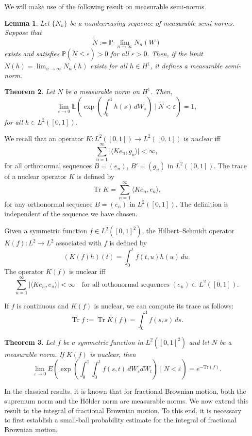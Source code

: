 \documentclass[preprint,12pt]{elsarticle}
\newtheorem{theorem}{Theorem}[section]
\newtheorem{lemma}[theorem]{Lemma}
\theoremstyle{definition}  %
\theoremstyle{plain}  %
\begin{document}
We will make use of the following result on measurable semi-norms.

\begin{lemma} \label{measurablenorm}
Let $\{N_n\}$ be a nondecreasing sequence of measurable semi-norms. 
Suppose that
\[
\tilde{N} := \mathbb{P}\text{-}\lim_{n \to \infty} N_n(W)
\]
exists and satisfies $\mathbb{P}(\tilde{N} \leq \varepsilon) > 0$ 
for all $\varepsilon > 0$. Then, if the limit $N(h) = \lim_{n \to \infty} N_n(h)$
exists for all $h \in H^1$, it defines a measurable 
semi-norm.
\end{lemma}



	
	\begin{theorem}\label{estimate1}
Let \( N \) be a measurable norm on \( H^{1} \). Then, 
\[
\lim _{\varepsilon \to 0} \mathbb{E}\left( \exp \left( \int_{0}^{1} h(s) \, d W_{s} \right) \mid \tilde{N} < \varepsilon \right) = 1,
\]
for all \( h \in L^{2}([0,1]) \).
\end{theorem}
    We recall that an operator $K : L^2([0,1]) \to L^2([0,1])$ is \emph{nuclear} iff 
\[
\sum_{n=1}^\infty \big| \langle K e_n, g_n \rangle \big| < \infty,
\]
for all orthonormal sequences $B=(e_n)$, $B'=(g_n)$ in $L^2([0,1])$.  
 The trace of a nuclear operator $K$ is defined by
\[
\operatorname{Tr} K = \sum_{n=1}^\infty \langle K e_n, e_n \rangle,
\]
for any orthonormal sequence $B=(e_n)$ in $L^2([0,1])$.  
The definition is independent of the sequence we have chosen.



Given a symmetric function $f \in L^2([0,1]^2)$, the Hilbert--Schmidt operator 
$K(f) : L^2 \to L^2$ associated with $f$ is defined by
\begin{equation}\label{eq:Kf}
  (K(f)h)(t) = \int_0^t f(t,u) h(u)\,du.
\end{equation}
The operator $K(f)$ is nuclear iff
\[
\sum_{n=1}^\infty \big|\langle K e_n, e_n \rangle \big| < \infty
\quad \text{for all orthonormal sequences } (e_n) \subset L^2([0,1]).
\]

If $f$ is continuous and $K(f)$ is nuclear, we can compute its trace as follows:
\[
\operatorname{Tr} f := \operatorname{Tr} K(f) = \int_0^1 f(s,s)\,ds.
\]

	\begin{theorem}\label{estimate2}
Let \( f \) be a symmetric function in \( L^{2}([0,1]^{2}) \) and let \( N \) be a measurable norm. If \( K(f) \) is nuclear, then 
\[
\lim _{\varepsilon \to 0} E\left( \exp \left( \int_{0}^{1} \int_{0}^{1} f(s, t) \, d W_{s} d W_{t} \right) \mid \tilde{N} < \varepsilon \right) = e^{-\text{Tr}(f)}.
\]
\end{theorem}
In the classical results, it is known that for fractional Brownian motion, 
both the supremum norm and the H\"older norm are measurable norms. 
We now extend this result to the integral of fractional Brownian motion. 
To this end, it is necessary to first establish a small-ball probability estimate 
for the integral of fractional Brownian motion.
\end{document}
